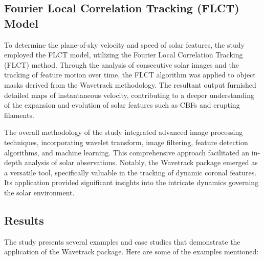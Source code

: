 \subsection{Fourier Local Correlation Tracking (FLCT) Model}
To determine the plane-of-sky velocity and speed of solar features, the study employed the FLCT model, utilizing the Fourier Local Correlation Tracking (FLCT) method. Through the analysis of consecutive solar images and the tracking of feature motion over time, the FLCT algorithm was applied to object masks derived from the Wavetrack methodology. The resultant output furnished detailed maps of instantaneous velocity, contributing to a deeper understanding of the expansion and evolution of solar features such as CBFs and erupting filaments.

The overall methodology of the study integrated advanced image processing techniques, incorporating wavelet transform, image filtering, feature detection algorithms, and machine learning. This comprehensive approach facilitated an in-depth analysis of solar observations. Notably, the Wavetrack package emerged as a versatile tool, specifically valuable in the tracking of dynamic coronal features. Its application provided significant insights into the intricate dynamics governing the solar environment.

\subsection{Results}
The study presents several examples and case studies that demonstrate the application of the Wavetrack package. Here are some of the examples mentioned:

